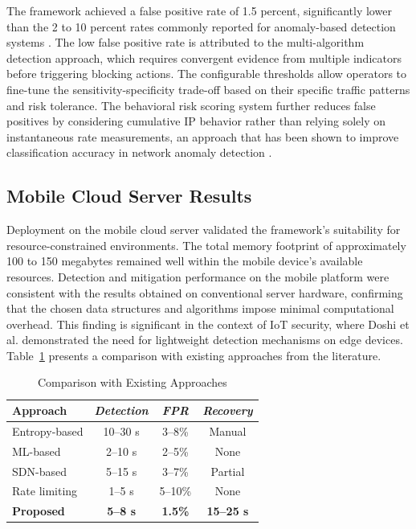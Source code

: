 \documentclass[conference]{IEEEtran}
\begin{document}
The framework achieved a false positive rate of 1.5 percent, significantly lower than the 2 to 10 percent rates commonly reported for anomaly-based detection systems \cite{b5} \cite{b13}. The low false positive rate is attributed to the multi-algorithm detection approach, which requires convergent evidence from multiple indicators before triggering blocking actions. The configurable thresholds allow operators to fine-tune the sensitivity-specificity trade-off based on their specific traffic patterns and risk tolerance. The behavioral risk scoring system further reduces false positives by considering cumulative IP behavior rather than relying solely on instantaneous rate measurements, an approach that has been shown to improve classification accuracy in network anomaly detection \cite{b14}.

\subsection{Mobile Cloud Server Results}

Deployment on the mobile cloud server validated the framework's suitability for resource-constrained environments. The total memory footprint of approximately 100 to 150 megabytes remained well within the mobile device's available resources. Detection and mitigation performance on the mobile platform were consistent with the results obtained on conventional server hardware, confirming that the chosen data structures and algorithms impose minimal computational overhead. This finding is significant in the context of IoT security, where Doshi et al. \cite{b11} demonstrated the need for lightweight detection mechanisms on edge devices. Table~\ref{tab_compare} presents a comparison with existing approaches from the literature.

\begin{table}[htbp]
\caption{Comparison with Existing Approaches}
\begin{center}
\begin{tabular}{|l|c|c|c|}
\hline
\textbf{Approach} & \textbf{\textit{Detection}} & \textbf{\textit{FPR}} & \textbf{\textit{Recovery}} \\
\hline
Entropy-based \cite{b4} & 10--30 s & 3--8\% & Manual \\
\hline
ML-based \cite{b5} & 2--10 s & 2--5\% & None \\
\hline
SDN-based \cite{b6} & 5--15 s & 3--7\% & Partial \\
\hline
Rate limiting \cite{b15} & 1--5 s & 5--10\% & None \\
\hline
\textbf{Proposed} & \textbf{5--8 s} & \textbf{1.5\%} & \textbf{15--25 s} \\
\hline
\end{tabular}
\label{tab_compare}
\end{center}
\end{table}
\end{document}
